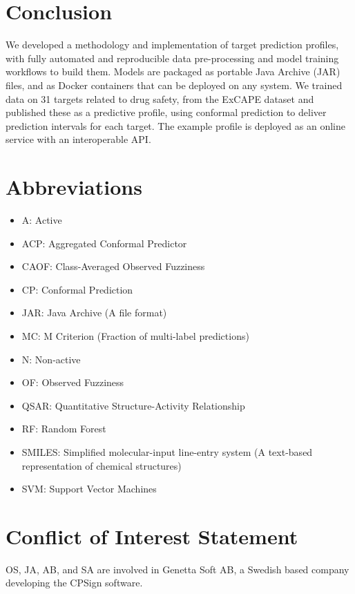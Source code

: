 \documentclass[utf8]{frontiersSCNS} %
\begin{document}
\FloatBarrier
\section*{Conclusion}
We developed a methodology and implementation of target prediction profiles,
with fully automated and reproducible data pre-processing and model training
workflows to build them. Models are packaged as portable Java Archive (JAR)
files, and as Docker containers that can be deployed on any system. We trained
data on 31 targets related to drug safety, from the ExCAPE dataset and published
these as a predictive profile, using conformal prediction to deliver prediction
intervals for each target. The example profile is deployed as an online service
with an interoperable API.




\section*{Abbreviations}

\begin{itemize}
    \item A: Active
    \item ACP: Aggregated Conformal Predictor
    \item CAOF: Class-Averaged Observed Fuzziness
    \item CP: Conformal Prediction
    \item JAR: Java Archive (A file format)
    \item MC: M Criterion (Fraction of multi-label predictions)
    \item N: Non-active
    \item OF: Observed Fuzziness
    \item QSAR: Quantitative Structure-Activity Relationship
    \item RF: Random Forest
    \item SMILES: Simplified molecular-input line-entry system (A text-based representation of chemical structures)
    \item SVM: Support Vector Machines
\end{itemize}

\section*{Conflict of Interest Statement}
OS, JA, AB, and SA are involved in Genetta Soft AB, a Swedish based company
developing the CPSign software.
\end{document}
